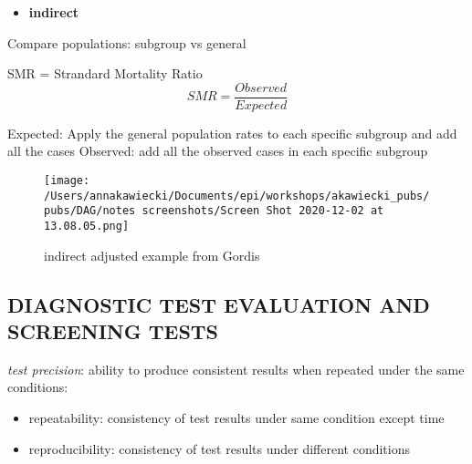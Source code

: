 \documentclass[
]{article}
\providecommand{\tightlist}{%
  \setlength{\itemsep}{0pt}\setlength{\parskip}{0pt}}
\begin{document}
\begin{itemize}
\tightlist
\item
  \textbf{indirect}
\end{itemize}

Compare populations: subgroup vs general

SMR = Strandard Mortality Ratio \[SMR= \frac{Observed}{Expected}\]

Expected: Apply the general population rates to each specific subgroup
and add all the cases Observed: add all the observed cases in each
specific subgroup

\begin{figure}
\centering
\texttt{[image: /Users/annakawiecki/Documents/epi/workshops/akawiecki\_pubs/pubs/DAG/notes screenshots/Screen Shot 2020-12-02 at 13.08.05.png]}
\caption{indirect adjusted example from Gordis}
\end{figure}

\hypertarget{diagnostic-test-evaluation-and-screening-tests}{%
\subsection{DIAGNOSTIC TEST EVALUATION AND SCREENING
TESTS}\label{diagnostic-test-evaluation-and-screening-tests}}

\emph{test precision}: ability to produce consistent results when
repeated under the same conditions:

\begin{itemize}
\item
  repeatability: consistency of test results under same condition except
  time
\item
  reproducibility: consistency of test results under different
  conditions
\end{itemize}
\end{document}

